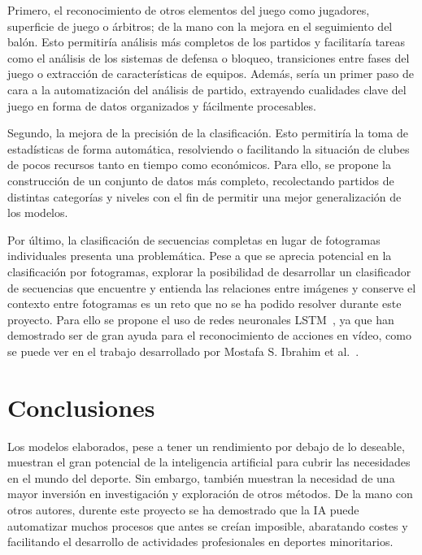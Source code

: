 \documentclass[12pt]{report} %
\begin{document}
    Primero, el reconocimiento de otros elementos del juego como jugadores,
    superficie de juego o árbitros; de la mano con la mejora en el seguimiento
    del balón. Esto permitiría análisis más completos de los partidos y
    facilitaría tareas como el análisis de los sistemas de defensa o bloqueo,
    transiciones entre fases del juego o extracción de características de
    equipos. Además, sería un primer paso de cara a la automatización del
    análisis de partido, extrayendo cualidades clave del juego en forma de
    datos organizados y fácilmente procesables.

    Segundo, la mejora de la precisión de la clasificación. Esto permitiría la
    toma de estadísticas de forma automática, resolviendo o facilitando la
    situación de clubes de pocos recursos tanto en tiempo como económicos. Para
    ello, se propone la construcción de un conjunto de datos más completo,
    recolectando partidos de distintas categorías y niveles con el fin de
    permitir una mejor generalización de los modelos.

    Por último, la clasificación de secuencias completas en lugar de fotogramas
    individuales presenta una problemática. Pese a que se aprecia potencial en
    la clasificación por fotogramas, explorar la posibilidad de desarrollar un
    clasificador de secuencias que encuentre y entienda las relaciones entre
    imágenes y conserve el contexto entre fotogramas es un reto que no se ha
    podido resolver durante este proyecto. Para ello se propone el uso de redes
    neuronales LSTM~\cite{Hochreiter1997LongSM}, ya que han demostrado ser de
    gran ayuda para el reconocimiento de acciones en vídeo, como se puede ver
    en el trabajo desarrollado por Mostafa S. Ibrahim et
    al.~\cite{Ibrahim_2016_CVPR}.
    

    \chapter{Conclusiones}
    \label{chap:conclusion}

    Los modelos elaborados, pese a tener un rendimiento por debajo de lo
    deseable, muestran el gran potencial de la inteligencia artificial para
    cubrir las necesidades en el mundo del deporte. Sin embargo, también
    muestran la necesidad de una mayor inversión en investigación y exploración
    de otros métodos. De la mano con otros autores, durente este proyecto se ha
    demostrado que la IA puede automatizar muchos procesos que antes se creían
    imposible, abaratando costes y facilitando el desarrollo de actividades
    profesionales en deportes minoritarios. 
\end{document}
